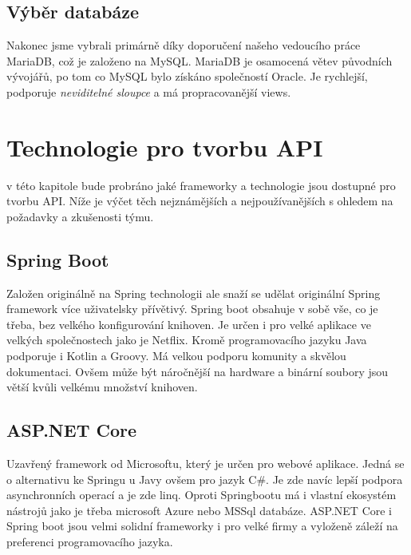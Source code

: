 \subsection{Výběr databáze}\label{sec:data_storage:summary}
Nakonec jsme vybrali primárně díky doporučení našeho vedoucího práce MariaDB, což je založeno na MySQL. MariaDB je osamocená větev původních vývojářů, po tom co MySQL bylo získáno společností Oracle. Je rychlejší, podporuje \textit{neviditelné sloupce} a má propracovanější views.

\section{Technologie pro tvorbu API}\label{sec:api_technologies}
v této kapitole bude probráno jaké frameworky a technologie jsou dostupné pro tvorbu API. Níže je výčet těch nejznámějších a nejpoužívanějších s ohledem na požadavky a zkušenosti týmu.

\subsection{Spring Boot}\label{sec:api_technologies:spring}
Založen originálně na Spring technologii ale snaží se udělat originální Spring framework více uživatelsky přívětivý. Spring boot obsahuje v sobě vše, co je třeba, bez velkého konfigurování knihoven. Je určen i pro velké aplikace ve velkých společnostech jako je Netflix. Kromě programovacího jazyku Java podporuje i Kotlin a Groovy. Má velkou podporu komunity a skvělou dokumentaci. Ovšem může být náročnější na hardware a binární soubory jsou větší kvůli velkému množství knihoven.

\subsection{ASP.NET Core}\label{sec:api_technologies:asp}
Uzavřený framework od Microsoftu, který je určen pro webové aplikace. Jedná se o alternativu ke Springu u Javy ovšem pro jazyk C\#. Je zde navíc lepší podpora asynchronních operací a je zde \gls{linq}. Oproti Springbootu má i vlastní ekosystém nástrojů jako je třeba microsoft Azure nebo MSSql databáze. ASP.NET Core i Spring boot jsou velmi solidní frameworky i pro velké firmy a vyloženě záleží na preferenci programovacího jazyka.

